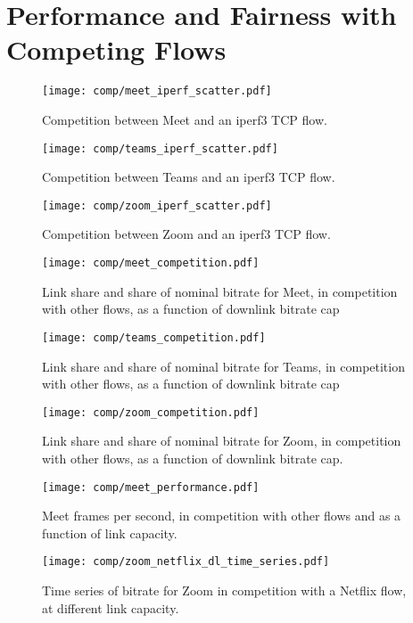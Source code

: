 \section{Performance and Fairness with Competing Flows}

\begin{figure}[]
    \texttt{[image: comp/meet\_iperf\_scatter.pdf]}
    \caption{Competition between Meet and an iperf3 TCP flow.}
	\label{fig:comp_meet_iperf}
\end{figure}

\begin{figure}[]
    \texttt{[image: comp/teams\_iperf\_scatter.pdf]}
    \caption{Competition between Teams and an iperf3 TCP flow.}
	\label{fig:comp_teams_iperf}
\end{figure}

\begin{figure}[]
    \texttt{[image: comp/zoom\_iperf\_scatter.pdf]}
    \caption{Competition between Zoom and an iperf3 TCP flow.}
	\label{fig:comp_zoom_iperf}
\end{figure}

\begin{figure}[]
    \texttt{[image: comp/meet\_competition.pdf]}
    \caption{Link share and share of nominal bitrate for Meet, in competition with other flows, as a function of downlink bitrate cap}
	\label{fig:meet_comp_bitrates}
\end{figure}

\begin{figure}[]
    \texttt{[image: comp/teams\_competition.pdf]}
    \caption{Link share and share of nominal bitrate for Teams, in competition with other flows, as a function of downlink bitrate cap}
	\label{fig:teams_comp_bitrates}
\end{figure}

\begin{figure}[]
    \texttt{[image: comp/zoom\_competition.pdf]}
    \caption{Link share and share of nominal bitrate for Zoom, in competition with other flows, as a function of downlink bitrate cap.}
	\label{fig:zoom_comp_bitrates}
\end{figure}

\begin{figure}[]
    \texttt{[image: comp/meet\_performance.pdf]}
    \caption{Meet frames per second, in competition with other flows and as a function of link capacity.}
	\label{fig:meet_comp_performance}
\end{figure}

\begin{figure}[]
    \texttt{[image: comp/zoom\_netflix\_dl\_time\_series.pdf]}
    \caption{Time series of bitrate for Zoom in competition with a Netflix flow, at different link capacity.}
	\label{fig:ts_zoom_netflix}
\end{figure}
